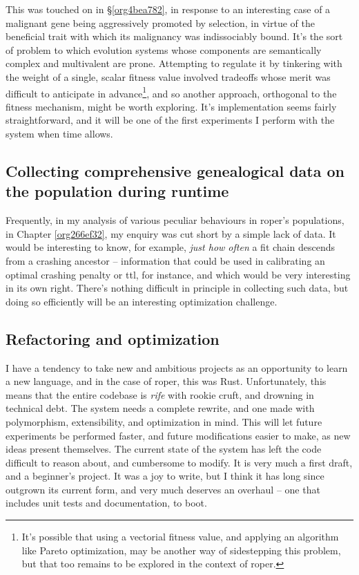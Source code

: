 \documentclass[12pt,glossary]{dalthesis}
\begin{document}
This was touched on in \S \ref{org4bea782}, in response to an interesting case
of a malignant gene being aggressively promoted by selection, in virtue of the
beneficial trait with which its malignancy was indissociably bound. It's the
sort of problem to which evolution systems whose components are semantically
complex and multivalent are prone. Attempting to regulate it by tinkering with
the weight of a single, scalar fitness value involved tradeoffs whose merit was
difficult to anticipate in advance\footnote{It's possible that using a vectorial fitness value, and applying an algorithm
  like Pareto optimization, may be another way of sidestepping this problem, but
  that too remains to be explored in the context of \gls{roper}.}, and so another approach, orthogonal to the fitness mechanism, might be worth
exploring. It's implementation seems fairly straightforward, and it will be one
of the first experiments I perform with the system when time allows. 

\subsection{Collecting comprehensive genealogical data on the population during runtime}
\label{sec:org40152e5}

Frequently, in my analysis of various peculiar behaviours in \gls{roper}'s
populations, in Chapter \ref{org266ef32}, my enquiry was cut short by a simple
lack of data. It would be interesting to know, for example, \emph{just how often} a
fit chain descends from a crashing ancestor -- information that could be used in
calibrating an optimal crashing penalty or \gls{ttl}, for instance, and which would
be very interesting in its own right. There's nothing difficult in principle in
collecting such data, but doing so efficiently will be an interesting optimization
challenge. 

\subsection{Refactoring and optimization}
\label{sec:org6cbd011}

I have a tendency to take new and ambitious projects as an opportunity to learn
a new language, and in the case of \gls{roper}, this was Rust. Unfortunately, this
means that the entire codebase is \emph{rife} with rookie cruft, and drowning in 
technical debt. The system needs a complete rewrite, and one made with polymorphism,
extensibility, and optimization in mind. This will let future experiments be 
performed faster, and future modifications easier to make, as new ideas present
themselves. The current state of the system has left the code difficult to reason
about, and cumbersome to modify. It is very much a first draft, and a beginner's
project. It was a joy to write, but I think it has long since outgrown its current
form, and very much deserves an overhaul -- one that includes unit tests and
documentation, to boot. 
\end{document}
